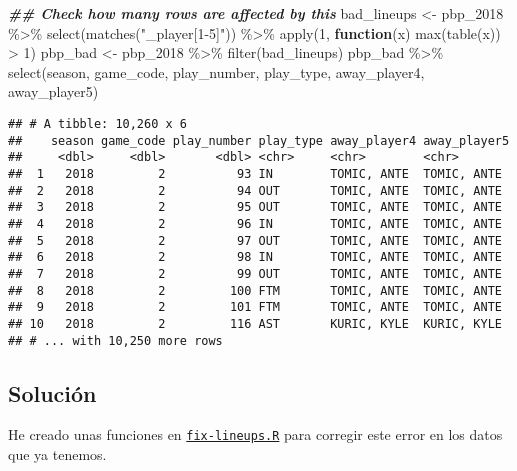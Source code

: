 \documentclass[
]{article}
\newenvironment{Shaded}{\begin{snugshade}}{\end{snugshade}}
\newcommand{\ControlFlowTok}[1]{\textcolor[rgb]{0.13,0.29,0.53}{\textbf{#1}}}
\newcommand{\DecValTok}[1]{\textcolor[rgb]{0.00,0.00,0.81}{#1}}
\newcommand{\DocumentationTok}[1]{\textcolor[rgb]{0.56,0.35,0.01}{\textbf{\textit{#1}}}}
\newcommand{\FunctionTok}[1]{\textcolor[rgb]{0.00,0.00,0.00}{#1}}
\newcommand{\NormalTok}[1]{#1}
\newcommand{\OtherTok}[1]{\textcolor[rgb]{0.56,0.35,0.01}{#1}}
\newcommand{\SpecialCharTok}[1]{\textcolor[rgb]{0.00,0.00,0.00}{#1}}
\newcommand{\StringTok}[1]{\textcolor[rgb]{0.31,0.60,0.02}{#1}}
\begin{document}
\begin{Shaded}
\begin{Highlighting}[]
\DocumentationTok{\#\# Check how many rows are affected by this}
\NormalTok{bad\_lineups }\OtherTok{\textless{}{-}}\NormalTok{ pbp\_2018 }\SpecialCharTok{\%\textgreater{}\%}
  \FunctionTok{select}\NormalTok{(}\FunctionTok{matches}\NormalTok{(}\StringTok{"\_player[1{-}5]"}\NormalTok{)) }\SpecialCharTok{\%\textgreater{}\%}
  \FunctionTok{apply}\NormalTok{(}\DecValTok{1}\NormalTok{, }\ControlFlowTok{function}\NormalTok{(x) }\FunctionTok{max}\NormalTok{(}\FunctionTok{table}\NormalTok{(x)) }\SpecialCharTok{\textgreater{}} \DecValTok{1}\NormalTok{)}
\NormalTok{pbp\_bad }\OtherTok{\textless{}{-}}\NormalTok{ pbp\_2018 }\SpecialCharTok{\%\textgreater{}\%}
  \FunctionTok{filter}\NormalTok{(bad\_lineups)}
\NormalTok{pbp\_bad }\SpecialCharTok{\%\textgreater{}\%}
  \FunctionTok{select}\NormalTok{(season, game\_code, play\_number, play\_type, away\_player4, away\_player5)}
\end{Highlighting}
\end{Shaded}

\begin{verbatim}
## # A tibble: 10,260 x 6
##    season game_code play_number play_type away_player4 away_player5
##     <dbl>     <dbl>       <dbl> <chr>     <chr>        <chr>       
##  1   2018         2          93 IN        TOMIC, ANTE  TOMIC, ANTE 
##  2   2018         2          94 OUT       TOMIC, ANTE  TOMIC, ANTE 
##  3   2018         2          95 OUT       TOMIC, ANTE  TOMIC, ANTE 
##  4   2018         2          96 IN        TOMIC, ANTE  TOMIC, ANTE 
##  5   2018         2          97 OUT       TOMIC, ANTE  TOMIC, ANTE 
##  6   2018         2          98 IN        TOMIC, ANTE  TOMIC, ANTE 
##  7   2018         2          99 OUT       TOMIC, ANTE  TOMIC, ANTE 
##  8   2018         2         100 FTM       TOMIC, ANTE  TOMIC, ANTE 
##  9   2018         2         101 FTM       TOMIC, ANTE  TOMIC, ANTE 
## 10   2018         2         116 AST       KURIC, KYLE  KURIC, KYLE 
## # ... with 10,250 more rows
\end{verbatim}

\hypertarget{soluciuxf3n}{%
\subsection{Solución}\label{soluciuxf3n}}

He creado unas funciones en \href{fix-lineups.R}{\texttt{fix-lineups.R}}
para corregir este error en los datos que ya tenemos.
\end{document}
